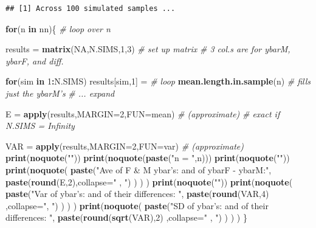 \documentclass[]{book}
\newenvironment{Shaded}{\begin{snugshade}}{\end{snugshade}}
\newcommand{\CommentTok}[1]{\textcolor[rgb]{0.56,0.35,0.01}{\textit{#1}}}
\newcommand{\ControlFlowTok}[1]{\textcolor[rgb]{0.13,0.29,0.53}{\textbf{#1}}}
\newcommand{\DataTypeTok}[1]{\textcolor[rgb]{0.13,0.29,0.53}{#1}}
\newcommand{\DecValTok}[1]{\textcolor[rgb]{0.00,0.00,0.81}{#1}}
\newcommand{\KeywordTok}[1]{\textcolor[rgb]{0.13,0.29,0.53}{\textbf{#1}}}
\newcommand{\NormalTok}[1]{#1}
\newcommand{\OperatorTok}[1]{\textcolor[rgb]{0.81,0.36,0.00}{\textbf{#1}}}
\newcommand{\OtherTok}[1]{\textcolor[rgb]{0.56,0.35,0.01}{#1}}
\newcommand{\StringTok}[1]{\textcolor[rgb]{0.31,0.60,0.02}{#1}}
\begin{document}
\begin{verbatim}
## [1] Across 100 simulated samples ...
\end{verbatim}

\begin{Shaded}
\begin{Highlighting}[]
\ControlFlowTok{for}\NormalTok{(n }\ControlFlowTok{in}\NormalTok{ nn)\{                            }\CommentTok{# loop over n}
  
\NormalTok{  results =}\StringTok{ }\KeywordTok{matrix}\NormalTok{(}\OtherTok{NA}\NormalTok{,N.SIMS,}\DecValTok{1}\NormalTok{,}\DecValTok{3}\NormalTok{) }\CommentTok{# set up matrix}
                            \CommentTok{# 3 col.s are for ybarM, ybarF, and diff.}
  
  \ControlFlowTok{for}\NormalTok{(sim }\ControlFlowTok{in} \DecValTok{1}\OperatorTok{:}\NormalTok{N.SIMS) results[sim,}\DecValTok{1}\NormalTok{] =}\StringTok{  }\CommentTok{# loop }
\StringTok{              }\KeywordTok{mean.length.in.sample}\NormalTok{(n)   }\CommentTok{# fills just the ybarM's}
                                         \CommentTok{# ... expand }
  
  
\NormalTok{  E   =}\StringTok{ }\KeywordTok{apply}\NormalTok{(results,}\DataTypeTok{MARGIN=}\DecValTok{2}\NormalTok{,}\DataTypeTok{FUN=}\NormalTok{mean) }\CommentTok{# (approximate)}
                                         \CommentTok{# exact if N.SIMS = Infinity}
  
\NormalTok{  VAR =}\StringTok{ }\KeywordTok{apply}\NormalTok{(results,}\DataTypeTok{MARGIN=}\DecValTok{2}\NormalTok{,}\DataTypeTok{FUN=}\NormalTok{var)  }\CommentTok{# (approximate) }
  \KeywordTok{print}\NormalTok{(}\KeywordTok{noquote}\NormalTok{(}\StringTok{""}\NormalTok{))}
  \KeywordTok{print}\NormalTok{(}\KeywordTok{noquote}\NormalTok{(}\KeywordTok{paste}\NormalTok{(}\StringTok{"n = "}\NormalTok{,n)))}
  \KeywordTok{print}\NormalTok{(}\KeywordTok{noquote}\NormalTok{(}\StringTok{""}\NormalTok{))}
  \KeywordTok{print}\NormalTok{(}\KeywordTok{noquote}\NormalTok{(}
    \KeywordTok{paste}\NormalTok{(}\StringTok{"Ave of F & M ybar's: and of ybarF - ybarM:"}\NormalTok{, }
           \KeywordTok{paste}\NormalTok{(}\KeywordTok{round}\NormalTok{(E,}\DecValTok{2}\NormalTok{),}\DataTypeTok{collapse=}\StringTok{" ,  "}\NormalTok{) )  ) )}
  \KeywordTok{print}\NormalTok{(}\KeywordTok{noquote}\NormalTok{(}\StringTok{""}\NormalTok{))}
  \KeywordTok{print}\NormalTok{(}\KeywordTok{noquote}\NormalTok{(}
    \KeywordTok{paste}\NormalTok{(}\StringTok{"Var of ybar's: and of their differences:  "}\NormalTok{, }
           \KeywordTok{paste}\NormalTok{(}\KeywordTok{round}\NormalTok{(VAR,}\DecValTok{4}\NormalTok{) ,}\DataTypeTok{collapse=}\StringTok{", "}\NormalTok{) ) ) )}
    \KeywordTok{print}\NormalTok{(}\KeywordTok{noquote}\NormalTok{(}
    \KeywordTok{paste}\NormalTok{(}\StringTok{"SD of ybar's: and of their differences:   "}\NormalTok{, }
           \KeywordTok{paste}\NormalTok{(}\KeywordTok{round}\NormalTok{(}\KeywordTok{sqrt}\NormalTok{(VAR),}\DecValTok{2}\NormalTok{) ,}\DataTypeTok{collapse=}\StringTok{" ,  "}\NormalTok{) ) ) )  }
\NormalTok{\}}
\end{Highlighting}
\end{Shaded}
\end{document}
